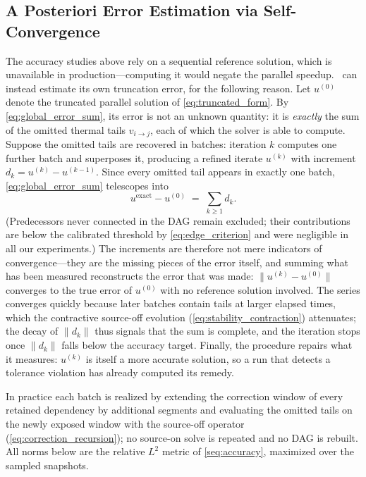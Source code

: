 \subsection{A Posteriori Error Estimation via Self-Convergence}
\label{seq:self_convergence}

The accuracy studies above rely on a sequential reference solution, which is
unavailable in production---computing it would negate the parallel speedup.
\method\ can instead estimate its own truncation error, for the following
reason. Let $u^{(0)}$ denote the truncated parallel solution of
\cref{eq:truncated_form}. By \cref{eq:global_error_sum}, its error is not an
unknown quantity: it is \emph{exactly} the sum of the omitted thermal tails
$v_{i\to j}$, each of which the solver is able to compute. Suppose the
omitted tails are recovered in batches: iteration $k$ computes one further
batch and superposes it, producing a refined iterate $u^{(k)}$ with increment
$d_k = u^{(k)} - u^{(k-1)}$. Since every omitted tail appears in exactly one
batch, \cref{eq:global_error_sum} telescopes into
\begin{equation}
u^{\mathrm{exact}} - u^{(0)} \;=\; \sum_{k\ge 1} d_k .
\label{eq:telescoping}
\end{equation}
(Predecessors never connected in the DAG remain excluded; their
contributions are below the calibrated threshold by \cref{eq:edge_criterion}
and were negligible in all our experiments.) The increments are therefore
not mere indicators of convergence---they are the missing pieces of the
error itself, and summing what has been measured reconstructs the error that
was made: $\|u^{(k)} - u^{(0)}\|$ converges to
the true error of $u^{(0)}$ with no reference solution involved. The series
converges quickly because later batches contain tails at larger elapsed
times, which the contractive source-off evolution
(\cref{eq:stability_contraction}) attenuates; the decay of $\|d_k\|$ thus
signals that the sum is complete, and the iteration stops once $\|d_k\|$
falls below the accuracy target. Finally, the procedure repairs what it
measures: $u^{(k)}$ is itself a more accurate solution, so a run that
detects a tolerance violation has already computed its remedy.

In practice each batch is realized by extending the correction window of
every retained dependency by additional segments and evaluating the omitted
tails on the newly exposed window with the source-off operator
(\cref{eq:correction_recursion}); no source-on solve is repeated and no DAG
is rebuilt. All norms below are the relative $L^2$ metric of
\cref{seq:accuracy}, maximized over the sampled snapshots.

